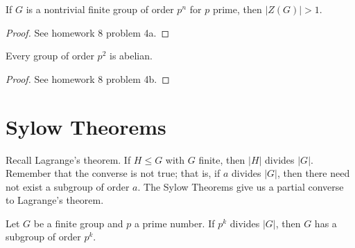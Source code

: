 \begin{corollary}
	If $G$ is a nontrivial finite group of order $p^n$ for $p$ prime, then $\left| Z(G) \right| >1$.
\end{corollary}
\begin{proof}
	See homework 8 problem 4a.
\end{proof}
\begin{corollary}
	Every group of order $p^2$ is abelian.
\end{corollary}
\begin{proof}
	See homework 8 problem 4b.
\end{proof}
\section{Sylow Theorems}
Recall Lagrange's theorem. If $H\leq G$ with $G$ finite, then $\left| H \right| $ divides $\left| G \right| $. Remember that the converse is not true; that is, if $a$ divides $\left| G \right| $, then there need not exist a subgroup of order $a$. The Sylow Theorems give us a partial converse to Lagrange's theorem.
\begin{theorem}\label{thm:S1}
	Let $G$ be a finite group and $p$ a prime number. If $p^k$ divides $\left| G \right| $, then $G$ has a subgroup of order $p^k$.
\end{theorem}
